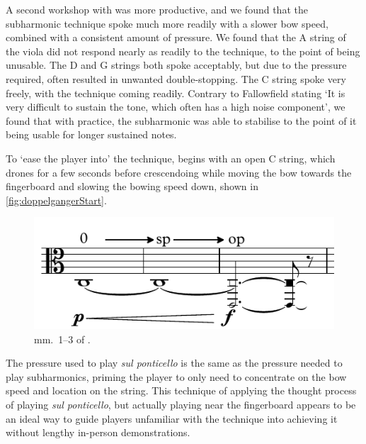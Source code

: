 A second workshop with \violaParticipant\space was more productive, and we found that the subharmonic technique spoke much more readily with a slower bow speed, combined with a consistent amount of pressure.\autocite[]{appleseedFeedbackSightreadingSession2019}
We found that the A string of the viola did not respond nearly as readily to the technique, to the point of being unusable.
The D and G strings both spoke acceptably, but due to the pressure required, often resulted in unwanted double-stopping.
The C string spoke very freely, with the technique coming readily.
Contrary to Fallowfield stating `It is very difficult to sustain the tone, which often has a high noise component', we found that with practice, the subharmonic was able to stabilise to the point of it being usable for longer sustained notes.\autocites[http://www.cellomap.com/index/the-string/plucking-striking-and-bowing-the-string/how.html]{fallowfieldCelloMapHandbook2009}[]{fallowfieldCelloMapExample2013}[]{appleseedFeedbackSightreadingSession2019}

To `ease the player into' the technique, \violaPiece\space begins with an open C string, which drones for a few seconds before crescendoing while moving the bow towards the fingerboard and slowing the bowing speed down, shown in \autoref{fig:doppelgangerStart}.
\begin{figure}
  \centering
  \includegraphics{./resources/doppelgangerStart.pdf}
  \caption{mm.\ 1--3 of \violaPiece.}\label{fig:doppelgangerStart}
\end{figure}
The pressure used to play \emph{sul ponticello} is the same as the pressure needed to play subharmonics, priming the player to only need to concentrate on the bow speed and location on the string.\autocite[]{appleseedFeedbackSightreadingSession2019}
This technique of applying the thought process of playing \emph{sul ponticello}, but actually playing near the fingerboard appears to be an ideal way to guide players unfamiliar with the technique into achieving it without lengthy in-person demonstrations.\autocites[]{appleseedFeedbackSightreadingSession2019}{bloggsFeedbackContrabassSession2019}

